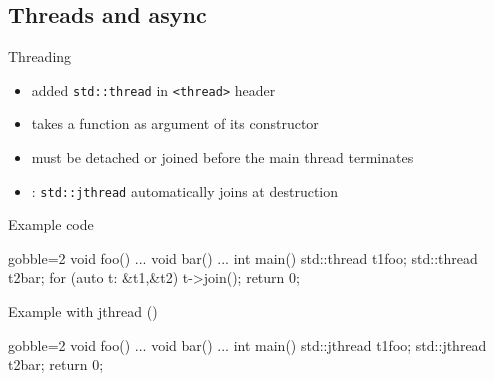 \subsection[thr]{Threads and async}

\begin{frame}[fragile]
  \begin{block}{Threading}
    \begin{itemize}
    \item {} added \texttt{std::thread} in \texttt{<thread>} header
    \item takes a function as argument of its constructor
    \item must be detached or joined before the main thread terminates
    \item {}: \texttt{std::jthread} automatically joins at destruction
    \end{itemize}
  \end{block}
  \vspace{-1\baselineskip}
  \begin{overprint}
    \begin{exampleblock}{Example code}
      \begin{cppcode*}{gobble=2}
        void foo() {...}
        void bar() {...}
        int main() {
          std::thread t1{foo};
          std::thread t2{bar};
          for (auto t: {&t1,&t2}) t->join();
          return 0;
        }
      \end{cppcode*}
    \end{exampleblock}
    \begin{exampleblock}{Example with jthread ()}
      \begin{cppcode*}{gobble=2}
        void foo() {...}
        void bar() {...}
        int main() {
          std::jthread t1{foo};
          std::jthread t2{bar};
          return 0;
        }
      \end{cppcode*}
    \end{exampleblock}
  \end{overprint}
\end{frame}

